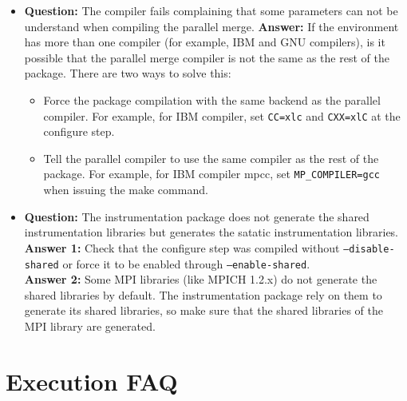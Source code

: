 \begin{itemize}
\item {\bf Question:} The compiler fails complaining that some parameters can not be understand when compiling the parallel merge.
      {\bf Answer:  } If the environment has more than one compiler (for example, IBM and GNU compilers), is it possible that the parallel merge compiler is not the same as the rest of the package. There are two ways to solve this:
      \begin{itemize}
      \item Force the package compilation with the same backend as the parallel compiler. For example, for IBM compiler, set {\tt CC=xlc} and {\tt CXX=xlC} at the configure step.
      \item Tell the parallel compiler to use the same compiler as the rest of the package. For example, for IBM compiler mpcc, set {\tt MP\_COMPILER=gcc} when issuing the make command.
      \end{itemize}

\item {\bf Question:} The instrumentation package does not generate the shared instrumentation libraries but generates the satatic instrumentation libraries.\\
      {\bf Answer 1:} Check that the configure step was compiled without {\tt --disable-shared} or force it to be enabled through {\tt --enable-shared}.\\
      {\bf Answer 2:} Some MPI libraries (like MPICH 1.2.x) do not generate the shared libraries by default. The instrumentation package rely on them to generate its shared libraries, so make sure that the shared libraries of the MPI library are generated.

\end{itemize}

\section{Execution FAQ}


